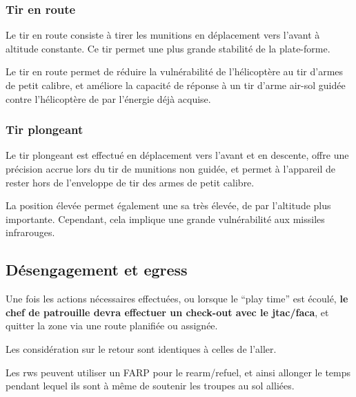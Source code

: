 \subsubsection{Tir en route}

\e
    \item Le tir en route consiste à tirer les munitions en déplacement vers l’avant à altitude constante. Ce tir permet une plus grande stabilité de la plate-forme.
    \item
    Le tir en route permet de réduire la vulnérabilité de l’hélicoptère au tir d’armes de petit calibre, et améliore la capacité de réponse à un tir d’arme air-sol guidée contre l’hélicoptère de par l’énergie déjà acquise.
\ed

\subsubsection{Tir plongeant}

\e
    \item
    Le tir plongeant est effectué en déplacement vers l’avant et en descente, offre une précision accrue lors du tir de munitions non guidée, et permet à l’appareil de rester hors de l’enveloppe de tir des armes de petit calibre.

    \item
    La position élevée permet également une \gls{sa} très élevée, de par l’altitude plus importante. Cependant, cela implique une grande vulnérabilité aux missiles infrarouges.
\ed

\subsection{Désengagement et egress}

\e
    \item
    Une fois les actions nécessaires effectuées, ou lorsque le “play time” est écoulé, \textbf{le chef de patrouille devra effectuer un check-out avec le \gls{jtac}/\gls{faca}}, et quitter la zone via une route planifiée ou assignée.
    \item Les considération sur le retour sont identiques à celles de l’aller.
    \item Les \gls{rw}s peuvent utiliser un FARP pour le rearm/refuel, et ainsi allonger le temps pendant lequel ils sont à même de soutenir les troupes au sol alliées.
    \item \hfill
    \item {}

\ed





